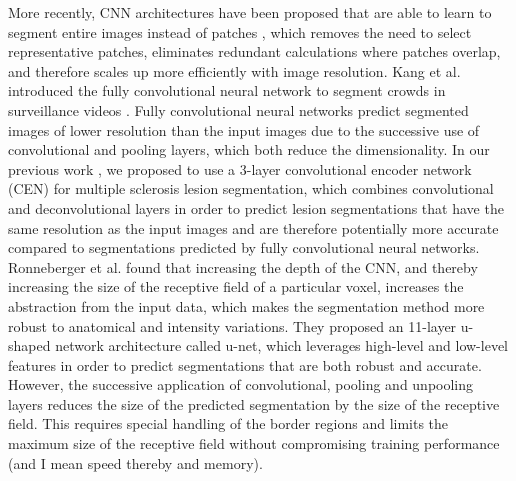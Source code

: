 More recently, CNN architectures have been proposed that are able to learn to
segment entire images instead of patches
\cite{ronneberger2015,brosch2015,kang2014fully}, which removes the need to
select representative patches, eliminates redundant calculations where patches
overlap, and therefore scales up more efficiently with image resolution. Kang et
al. introduced the fully convolutional neural network to segment crowds in
surveillance videos \cite{kang2014fully}. Fully convolutional neural networks
predict segmented images of lower resolution than the input images due to the
successive use of convolutional and pooling layers, which both reduce the
dimensionality. In our previous work \cite{brosch2015}, we proposed to use a
3-layer convolutional encoder network (CEN) for multiple sclerosis lesion
segmentation, which combines convolutional and deconvolutional layers in order
to predict lesion segmentations that have the same resolution as the input
images and are therefore potentially more accurate compared to segmentations
predicted by fully convolutional neural networks. Ronneberger et al.
\cite{ronneberger2015} found that increasing the depth of the CNN, and thereby
increasing the size of the receptive field of a particular voxel, increases the
abstraction from the input data, which makes the segmentation method more robust
to anatomical and intensity variations. They proposed an 11-layer u-shaped
network architecture called u-net, which leverages high-level and low-level
features in order to predict segmentations that are both robust and accurate.
However, the successive application of convolutional, pooling and unpooling
layers reduces the size of the predicted segmentation by the size of the
receptive field. This requires special handling of the border regions and limits
the maximum size of the receptive field without compromising training
performance (and I mean speed thereby and memory).

% 


